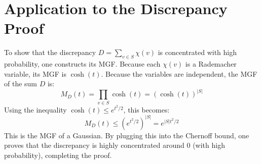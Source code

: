 \documentclass[11pt]{article}
\begin{document}
\section{Application to the Discrepancy Proof}

To show that the discrepancy \(D = \sum_{v \in S} \chi(v)\) is concentrated with high probability, one constructs its MGF. 
Because each \(\chi(v)\) is a Rademacher variable, its MGF is \(\cosh(t)\). Because the variables are independent, the MGF of the sum \(D\) is:
\[
 M_D(t) = \prod_{v \in S} \cosh(t) = (\cosh(t))^{|S|} 
\]
Using the inequality \( \cosh(t) \le e^{t^2/2} \), this becomes:
\[
 M_D(t) \le \left(e^{t^2/2}\right)^{|S|} = e^{|S|t^2/2} 
\]
This is the MGF of a Gaussian. By plugging this into the Chernoff bound, one proves that the discrepancy is highly concentrated around \(0\) (with high probability), completing the proof.
\end{document}
